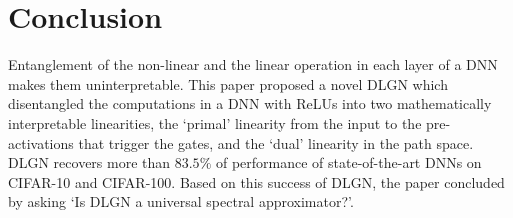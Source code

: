 \section{Conclusion}
Entanglement of the non-linear and the linear operation in each layer of a DNN makes them uninterpretable. This paper proposed a novel DLGN which disentangled the computations in a DNN with ReLUs into two mathematically interpretable linearities, the `primal' linearity from the input to the pre-activations that trigger the gates, and the `dual' linearity in the path space. DLGN recovers more than $83.5\%$ of performance of state-of-the-art DNNs on CIFAR-10 and CIFAR-100. Based on this success of DLGN, the paper concluded by asking `Is DLGN a universal spectral approximator?'.

